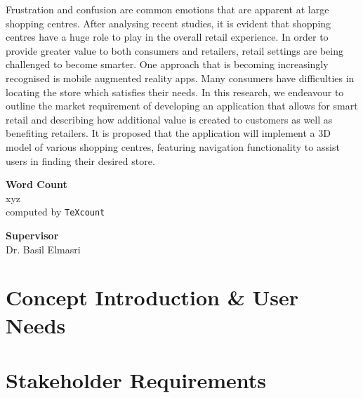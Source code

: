 \documentclass[12pt]{report}
\newcommand\blankpage{%
    \null
    \thispagestyle{empty}%
    \addtocounter{page}{-1}%
    \newpage}
\begin{document}
Frustration and confusion are common emotions that are apparent at large shopping centres. After analysing recent studies, it is evident that shopping centres have a huge role to play in the overall retail experience. In order to provide greater value to both consumers and retailers, retail settings are being challenged to become smarter. One approach that is becoming increasingly recognised is mobile augmented reality apps. Many consumers have difficulties in locating the store which satisfies their needs. In this research, we endeavour to outline the market requirement of developing an application that allows for smart retail and describing how additional value is created to customers as well as benefiting retailers. It is proposed that the application will implement a 3D model of various shopping centres, featuring navigation functionality to assist users in finding their desired store.\\

\vspace*{1.5cm}
\begin{center}    
    \large
    \textbf{Word Count}\\
    xyz\\
    \normalsize computed by \texttt{TeXcount}
\end{center}

\vspace*{1.5cm}
\begin{center}    
    \large
    \textbf{Supervisor}\\
    \normalsize Dr. Basil Elmasri
\end{center}

\afterpage{\blankpage}

\tableofcontents


\printnomenclature[1in]

\afterpage{\blankpage}
\afterpage{\blankpage}

\chapter{Concept Introduction \& User Needs}


\chapter{Stakeholder Requirements}

\end{document}
